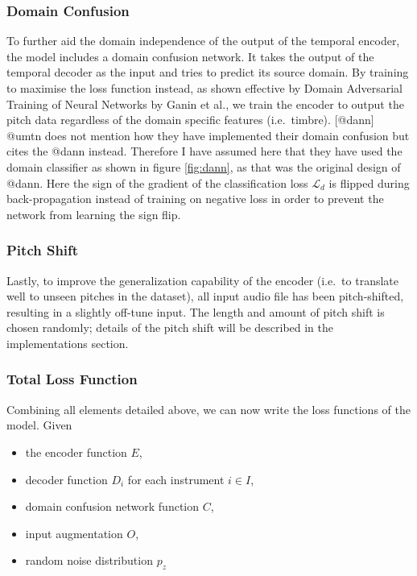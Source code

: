 \documentclass[12pt,a4paper,]{report}
\providecommand{\tightlist}{%
  \setlength{\itemsep}{0pt}\setlength{\parskip}{0pt}}
\begin{document}
\hypertarget{domain-confusion}{%
\subsubsection{Domain Confusion}\label{domain-confusion}}

To further aid the domain independence of the output of the temporal
encoder, the model includes a domain confusion network. It takes the
output of the temporal decoder as the input and tries to predict its
source domain. By training to maximise the loss function instead, as
shown effective by Domain Adversarial Training of Neural Networks by
Ganin et al., we train the encoder to output the pitch data regardless
of the domain specific features (i.e.~timbre). {[}@dann{]} @umtn does
not mention how they have implemented their domain confusion but cites
the @dann instead. Therefore I have assumed here that they have used the
domain classifier as shown in figure \ref{fig:dann}, as that was the
original design of @dann. Here the sign of the gradient of the
classification loss \(\mathcal{L}_d\) is flipped during back-propagation
instead of training on negative loss in order to prevent the network
from learning the sign flip.

\hypertarget{pitch-shift}{%
\subsubsection{Pitch Shift}\label{pitch-shift}}

Lastly, to improve the generalization capability of the encoder (i.e.~to
translate well to unseen pitches in the dataset), all input audio file
has been pitch-shifted, resulting in a slightly off-tune input. The
length and amount of pitch shift is chosen randomly; details of the
pitch shift will be described in the implementations section.

\hypertarget{total-loss-function}{%
\subsubsection{Total Loss Function}\label{total-loss-function}}

Combining all elements detailed above, we can now write the loss
functions of the model. Given

\begin{itemize}
\tightlist
\item
  the encoder function \(E\),
\item
  decoder function \(D_i\) for each instrument \(i \in I\),
\item
  domain confusion network function \(C\),
\item
  input augmentation \(O\),
\item
  random noise distribution \(p_z\)
\end{itemize}
\end{document}
